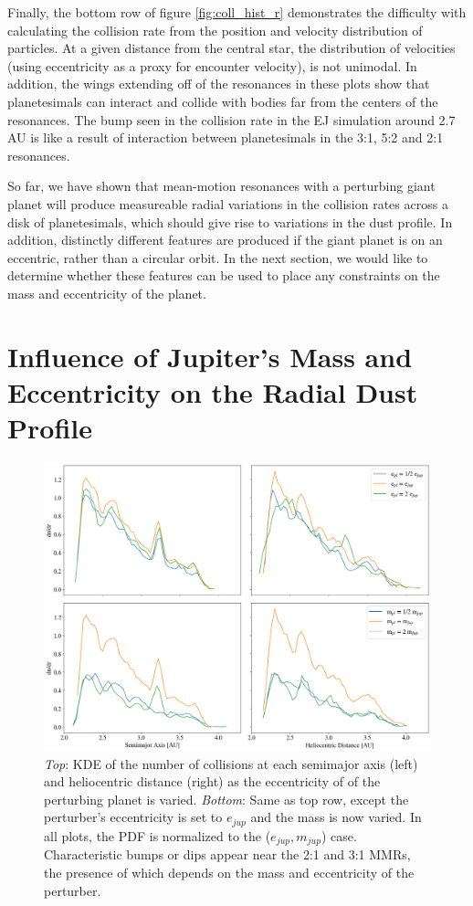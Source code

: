 \documentclass[onecolumn]{aastex63}
\begin{document}
Finally, the bottom row of figure \ref{fig:coll_hist_r} demonstrates the difficulty with calculating the collision rate from the position and velocity 
distribution of particles. At a given distance from the central star, the distribution of velocities (using eccentricity as a proxy for encounter 
velocity), is not unimodal. In addition, the wings extending off of the resonances in these plots show that planetesimals can interact and collide 
with bodies far from the centers of the resonances. The bump seen in the collision rate in the EJ simulation around 2.7 AU is like a result of 
interaction between planetesimals in the 3:1, 5:2 and 2:1 resonances.

So far, we have shown that mean-motion resonances with a perturbing giant planet will produce measureable radial variations in the collision 
rates across a disk of planetesimals, which should give rise to variations in the dust profile. In addition, distinctly different features are 
produced if the giant planet is on an eccentric, rather than a circular orbit. In the next section, we would like to determine whether these 
features can be used to place any constraints on the mass and eccentricity of the planet.

\section{Influence of Jupiter's Mass and Eccentricity on the Radial Dust Profile}

\begin{figure}
    \includegraphics[width=\textwidth]{figures/coll_hist_e_and_m.png}
    \caption{\textit{Top}: KDE of the number of collisions at each semimajor axis (left) and heliocentric distance (right) as the eccentricity of of the perturbing planet is varied. \textit{Bottom}:  Same as top row, except the perturber's eccentricity is set to $e_{jup}$ and the mass is now varied. In all plots, the PDF is normalized to the ($e_{jup}, m_{jup}$) case. Characteristic bumps or dips appear near the 2:1 and 3:1 MMRs, the presence of which depends on the mass and eccentricity of the perturber. \label{fig:coll_hist_e_and_m}}
\end{figure}
\end{document}
